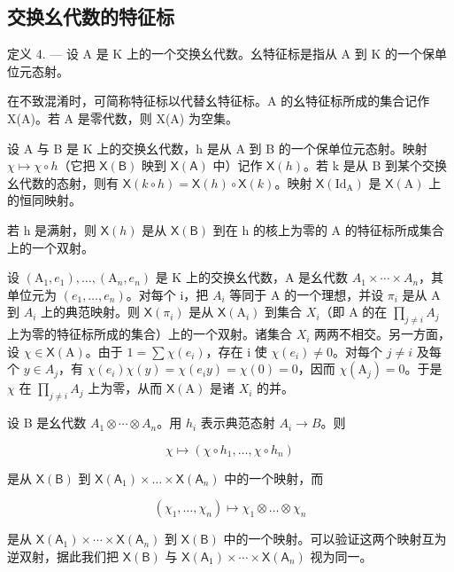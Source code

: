 \subsection{交换幺代数的特征标}

定义 4. --- 设 A 是 K 上的一个交换幺代数。幺特征标是指从 A 到 K 的一个保单位元态射。

在不致混淆时，可简称特征标以代替幺特征标。A 的幺特征标所成的集合记作 X(A)。若 A 是零代数，则 X(A) 为空集。

设 A 与 B 是 K 上的交换幺代数，h 是从 A 到 B 的一个保单位元态射。映射 \(\chi \mapsto \chi \circ h\)（它把 \(\mathsf{X}(\mathsf{B})\) 映到 \(\mathsf{X}(\mathsf{A})\) 中）记作 \(\mathsf{X}(h)\)。若 k 是从 B 到某个交换幺代数的态射，则有 \(\mathsf{X}(k \circ h) = \mathsf{X}(h) \circ \mathsf{X}(k)\)。映射 \(\mathsf{X}(\mathrm{Id}_{\mathrm{A}})\) 是 \(\mathsf{X}(\mathrm{A})\) 上的恒同映射。

若 h 是满射，则 \(\mathsf{X}(h)\) 是从 \(\mathsf{X}(\mathsf{B})\) 到在 h 的核上为零的 A 的特征标所成集合上的一个双射。

设 \((\mathrm{A}_{1},e_{1}),\ldots,(\mathrm{A}_{n},e_{n})\) 是 K 上的交换幺代数，A 是幺代数 \(A_{1}\times\cdots\times A_{n}\)，其单位元为 \((e_{1},\ldots,e_{n})\)。对每个 i，把 \(A_{i}\) 等同于 A 的一个理想，并设 \(\pi_{i}\) 是从 A 到 \(A_{i}\) 上的典范映射。则 \(\mathsf{X}(\pi_{i})\) 是从 \(\mathsf{X}(\mathrm{A}_{i})\) 到集合 \(X_{i}\)（即 A 的在 \(\prod_{j\neq i}A_{j}\) 上为零的特征标所成的集合）上的一个双射。诸集合 \(X_{i}\) 两两不相交。另一方面，设 \(\chi\in\mathsf{X}(\mathrm{A})\)。由于 \(1=\sum\chi(e_{i})\)，存在 i 使 \(\chi(e_{i})\neq0\)。对每个 \(j\neq i\) 及每个 \(y\in A_{j}\)，有 \(\chi(e_{i})\chi(y)=\chi(e_{i}y)=\chi(0)=0\)，因而 \(\chi(\mathrm{A}_{j})=0\)。于是 \(\chi\) 在 \(\prod_{j\neq i}A_{j}\) 上为零，从而 \(\mathsf{X}(\mathrm{A})\) 是诸 \(X_{i}\) 的并。

设 B 是幺代数 \(A_{1} \otimes \cdots \otimes A_{n}\)。用 \(h_{i}\) 表示典范态射 \(A_{i} \to B\)。则

\[
\chi \mapsto (\chi \circ h _ {1}, \dots , \chi \circ h _ {n})
\]

是从 \(\mathsf{X}(\mathsf{B})\) 到 \(\mathsf{X}(\mathsf{A}_1)\times \dots \times \mathsf{X}(\mathsf{A}_n)\) 中的一个映射，而

\[
\left(\chi_ {1}, \dots , \chi_ {n}\right) \mapsto \chi_ {1} \otimes \dots \otimes \chi_ {n}
\]

是从 \(\mathsf{X}(\mathsf{A}_{1}) \times \cdots \times \mathsf{X}(\mathsf{A}_{n})\) 到 \(\mathsf{X}(\mathsf{B})\) 中的一个映射。可以验证这两个映射互为逆双射，据此我们把 \(\mathsf{X}(\mathsf{B})\) 与 \(\mathsf{X}(\mathsf{A}_{1}) \times \cdots \times \mathsf{X}(\mathsf{A}_{n})\) 视为同一。

